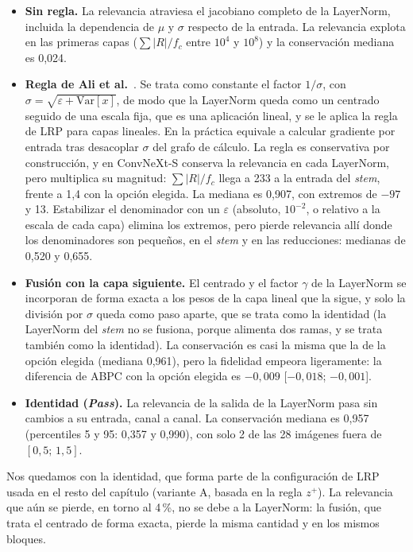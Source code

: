 \begin{itemize}
  \item \textbf{Sin regla.} La relevancia atraviesa el jacobiano completo de la LayerNorm, incluida
        la dependencia de $\mu$ y $\sigma$ respecto de la entrada. La relevancia explota en las
        primeras capas ($\sum|R|/f_c$ entre $10^{4}$ y $10^{8}$) y la conservación mediana es 0,024.
  \item \textbf{Regla de Ali et al.}~\cite{ali2022}. Se trata como constante el factor
        $1/\sigma$, con $\sigma = \sqrt{\varepsilon + \mathrm{Var}[x]}$, de modo que la LayerNorm
        queda como un centrado seguido de una escala fija, que es una aplicación lineal, y se le
        aplica la regla de LRP para capas lineales. En la práctica equivale a calcular gradiente por
        entrada tras desacoplar $\sigma$ del grafo de cálculo. La regla es conservativa por
        construcción, y en ConvNeXt-S conserva la relevancia en cada LayerNorm, pero multiplica su
        magnitud: $\sum|R|/f_c$ llega a
        233 a la entrada del \emph{stem}, frente a 1,4 con la opción elegida. La mediana es 0,907, con
        extremos de $-97$ y 13. Estabilizar el denominador con un $\varepsilon$ (absoluto, $10^{-2}$,
        o relativo a la escala de cada capa) elimina los extremos, pero pierde relevancia allí donde
        los denominadores son pequeños, en el \emph{stem} y en las reducciones: medianas de 0,520 y
        0,655.
  \item \textbf{Fusión con la capa siguiente.} El centrado y el factor $\gamma$ de la LayerNorm se
        incorporan de forma exacta a los pesos de la capa lineal que la sigue, y solo la división por
        $\sigma$ queda como paso aparte, que se trata como la identidad (la LayerNorm del \emph{stem} no
        se fusiona, porque alimenta dos ramas, y se trata también como la identidad). La conservación es casi la
        misma que la de la opción elegida (mediana 0,961), pero la fidelidad empeora ligeramente: la
        diferencia de ABPC con la opción elegida es $-0{,}009$ [$-0{,}018$; $-0{,}001$].
  \item \textbf{Identidad (\emph{Pass}).} La relevancia de la salida de la LayerNorm pasa sin cambios
        a su entrada, canal a canal. La conservación mediana es 0,957 (percentiles 5 y 95: 0,357 y
        0,990), con solo 2 de las 28 imágenes fuera de $[0{,}5;\,1{,}5]$.
\end{itemize}

Nos quedamos con la identidad, que forma parte de la configuración de LRP usada en el resto del
capítulo (variante A, basada en la regla $z^{+}$). La relevancia que
aún se pierde, en torno al 4\,\%, no se debe a la LayerNorm: la fusión, que trata el centrado de forma
exacta, pierde la misma cantidad y en los mismos bloques.

